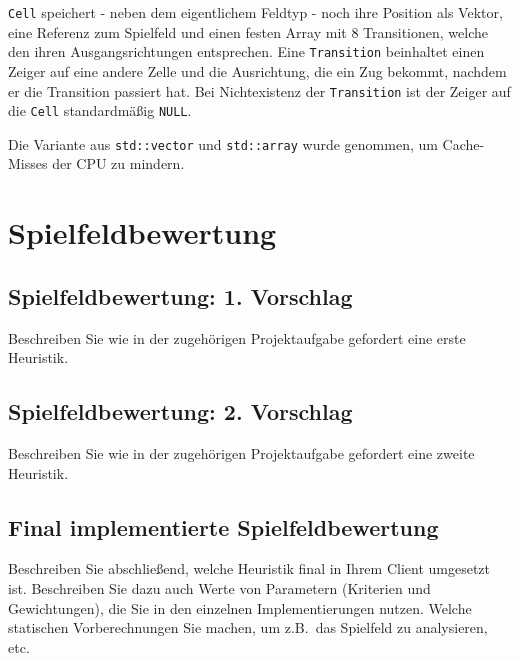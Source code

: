 \documentclass[12pt,a4paper]{article}
\begin{document}
\texttt{Cell} speichert - neben dem eigentlichem Feldtyp - noch ihre Position als Vektor, eine Referenz zum Spielfeld und einen festen Array mit 8 Transitionen, welche den ihren Ausgangsrichtungen entsprechen.
Eine \texttt{Transition} beinhaltet einen Zeiger auf eine andere Zelle und die Ausrichtung, die ein Zug bekommt, nachdem er die Transition passiert hat.
Bei Nichtexistenz der \texttt{Transition} ist der Zeiger auf die \texttt{Cell} standardmäßig \texttt{NULL}.

Die Variante aus \texttt{std::vector} und \texttt{std::array} wurde genommen, um Cache-Misses der CPU zu mindern.




\newpage
\section{Spielfeldbewertung}
\subsection{Spielfeldbewertung: 1. Vorschlag}
Beschreiben Sie wie in der zugehörigen Projektaufgabe gefordert eine erste Heuristik.

\subsection{Spielfeldbewertung: 2. Vorschlag}
Beschreiben Sie wie in der zugehörigen Projektaufgabe gefordert eine zweite Heuristik.

\subsection{Final implementierte Spielfeldbewertung}
Beschreiben Sie abschließend, welche Heuristik final in Ihrem Client umgesetzt ist. Beschreiben Sie dazu auch Werte von Parametern (Kriterien und Gewichtungen), die Sie in den einzelnen Implementierungen nutzen. Welche statischen Vorberechnungen Sie machen, um z.B.\ das Spielfeld zu analysieren, etc.
\end{document}
